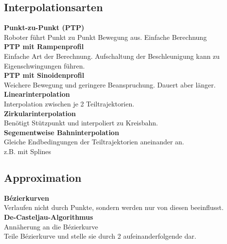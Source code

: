 \subsection{Interpolationsarten}%
\label{bs:sub:interpolationsarten}
\textbf{Punkt-zu-Punkt (PTP)}\\
Roboter führt Punkt zu Punkt Bewegung aus. Einfache Berechnung\\

\textbf{PTP mit Rampenprofil}\\
Einfache Art der Berechnung. Aufschaltung der Beschleunigung kann zu Eigenschwingungen führen.\\

\textbf{PTP mit Sinoidenprofil}\\
Weichere Bewegung und geringere Beanspruchung. Dauert aber länger.\\

\textbf{Linearinterpolation}\\
Interpolation zwischen je 2 Teiltrajektorien.\\

\textbf{Zirkularinterpolation}\\
Benötigt Stützpunkt und interpoliert zu Kreisbahn.\\

\textbf{Segementweise Bahninterpolation}\\
Gleiche Endbedingungen der Teiltrajektorien aneinander an.\\
z.B. mit Splines


\subsection{Approximation}%
\label{bs:sub:approximation}
\textbf{Bézierkurven}\\
Verlaufen nicht durch Punkte, sondern werden nur von diesen beeinflusst.\\

\textbf{De-Casteljau-Algorithmus}\\
Annäherung an die Bézierkurve\\
Teile Bézierkurve und stelle sie durch 2 aufeinanderfolgende dar.